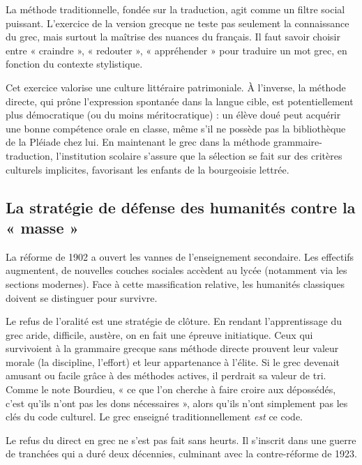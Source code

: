 La méthode traditionnelle, fondée sur la traduction, agit comme un filtre social puissant.
L'exercice de la version grecque ne teste pas seulement la connaissance du grec, mais surtout la
maîtrise des nuances du français. Il faut savoir choisir entre « craindre », « redouter », «
appréhender » pour traduire un mot grec, en fonction du contexte stylistique.

Cet exercice valorise une culture littéraire patrimoniale. À l'inverse, la méthode directe, qui
prône l'expression spontanée dans la langue cible, est potentiellement plus démocratique (ou du
moins méritocratique) : un élève doué peut acquérir une bonne compétence orale en classe, même s'il
ne possède pas la bibliothèque de la Pléiade chez lui. En maintenant le grec dans la méthode
grammaire-traduction, l'institution scolaire s'assure que la sélection se fait sur des critères
culturels implicites, favorisant les enfants de la bourgeoisie lettrée.\cite{I-2-2-ref19}



\subsection{La stratégie de défense des humanités contre la « masse »}

La réforme de 1902 a ouvert les vannes de l'enseignement secondaire. Les effectifs augmentent, de
nouvelles couches sociales accèdent au lycée (notamment via les sections modernes). Face à cette \og
massification\fg{} relative, les humanités classiques doivent se distinguer pour
survivre.\cite{I-2-2-ref21}

Le refus de l'oralité est une stratégie de clôture. En rendant l'apprentissage du grec aride,
difficile, austère, on en fait une épreuve initiatique. Ceux qui survivoient à la grammaire grecque
sans méthode directe prouvent leur valeur morale (la discipline, l'effort) et leur appartenance à
l'élite. Si le grec devenait \og amusant\fg{} ou \og facile\fg{} grâce à des méthodes actives, il
perdrait sa valeur de tri. Comme le note Bourdieu, « ce que l'on cherche à faire croire aux
dépossédés, c'est qu'ils n'ont pas les dons nécessaires », alors qu'ils n'ont simplement pas les
clés du code culturel.\cite{I-2-2-ref4} Le grec enseigné traditionnellement \textit{est} ce code.

Le refus du direct en grec ne s'est pas fait sans heurts. Il s'inscrit dans une guerre de tranchées
qui a duré deux décennies, culminant avec la contre-réforme de 1923.



